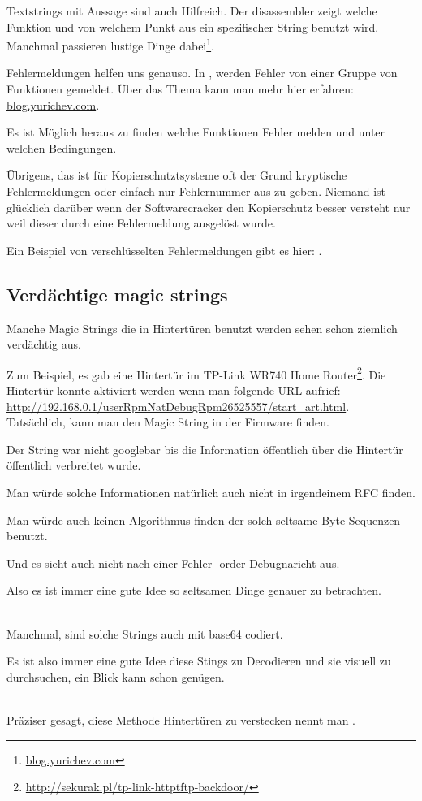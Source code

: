 Textstrings mit Aussage sind auch Hilfreich.
Der \IDA disassembler zeigt welche Funktion und von welchem Punkt aus ein spezifischer String benutzt wird.
Manchmal passieren lustige Dinge dabei\footnote{\href{http://go.yurichev.com/17223}{blog.yurichev.com}}.

Fehlermeldungen helfen uns genauso.
In \oracle, werden Fehler von einer Gruppe von Funktionen gemeldet.
\"Uber das Thema kann man mehr hier erfahren: \href{http://go.yurichev.com/17224}{blog.yurichev.com}.


Es ist M\"oglich heraus zu finden welche Funktionen Fehler melden und unter welchen Bedingungen.


\"Ubrigens, das ist f\"ur Kopierschutztsysteme oft der Grund kryptische Fehlermeldungen oder einfach nur 
Fehlernummer aus zu geben. Niemand ist gl\"ucklich dar\"uber wenn der Softwarecracker den Kopierschutz besser
versteht nur weil dieser durch eine Fehlermeldung ausgel\"ost wurde.

Ein Beispiel von verschl\"usselten Fehlermeldungen gibt es hier: .

\subsection{Verd\"achtige magic strings}

Manche Magic Strings die in Hintert\"uren benutzt werden sehen schon ziemlich verd\"achtig aus.

Zum Beispiel, es gab eine Hintert\"ur im TP-Link WR740 Home Router\footnote{\url{http://sekurak.pl/tp-link-httptftp-backdoor/}}.
Die Hintert\"ur konnte aktiviert werden wenn man folgende URL aufrief:
\url{http://192.168.0.1/userRpmNatDebugRpm26525557/start_art.html}.\\

Tats\"achlich, kann man den Magic String  in der Firmware finden.

Der String war nicht googlebar bis die Information \"offentlich \"uber die Hintert\"ur \"offentlich verbreitet wurde.


Man w\"urde solche Informationen nat\"urlich auch nicht in irgendeinem \ac{RFC} finden.


Man w\"urde auch keinen Algorithmus finden der solch seltsame Byte Sequenzen benutzt.


Und es sieht auch nicht nach einer Fehler- order Debugnaricht aus.


Also es ist immer eine gute Idee so seltsamen Dinge genauer zu betrachten.\\
\\

Manchmal, sind solche Strings auch mit base64 codiert.

Es ist also immer eine gute Idee diese Stings zu Decodieren und sie visuell zu durchsuchen, ein Blick
kann schon gen\"ugen.

\\
Pr\"aziser gesagt, diese Methode Hintert\"uren zu verstecken nennt man .
